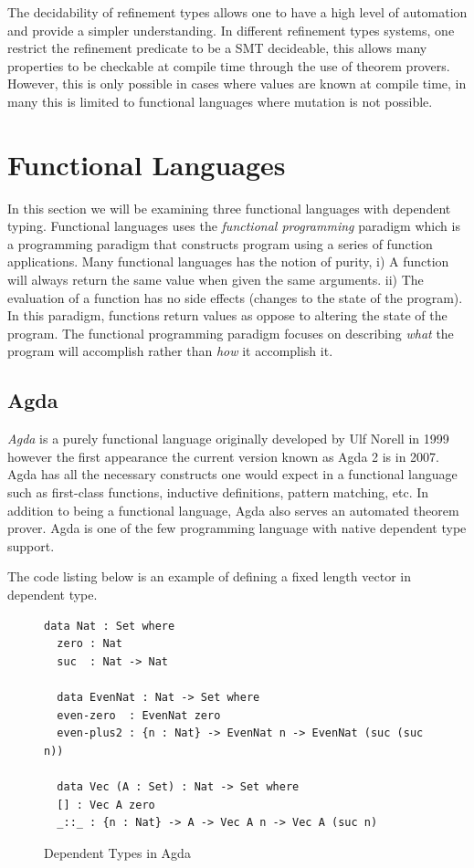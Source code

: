 \documentclass[a4paper,12pt]{report}
\begin{document}
\par
The decidability of refinement types allows one to have a high level of automation and 
provide a simpler understanding. In different refinement types systems, one 
restrict the refinement predicate to be a SMT decideable, this allows many 
properties to be checkable at compile time through the use of theorem provers. 
However, this is only possible in cases where values are known at compile time, 
in many this is limited to functional languages where mutation is not possible. 

\section{Functional Languages}
In this section we will be examining three functional languages with 
dependent typing. Functional languages 
uses the \textit{functional programming} \cite{overviewFP} paradigm which 
is a programming paradigm that constructs program using a series of function 
applications. Many functional languages has the notion of purity, i) A function will always 
return the same value when given the same arguments. ii) The evaluation of a 
function has no side effects (changes to the state of the program).
 In this paradigm, functions return values as oppose to 
altering the state of the program. The functional programming paradigm 
focuses on describing \textit{what} the program will accomplish rather than 
\textit{how} it accomplish it. 

\subsection{Agda}

\textit{Agda} \cite{agda} is a purely functional language originally developed by Ulf Norell in 
1999 however the first appearance the current version known as Agda 2 is in 
2007. Agda has all the necessary constructs one would expect in a functional 
language such as first-class functions, inductive definitions, pattern matching, 
etc. In addition to being a functional language, Agda also serves an automated theorem prover. 
Agda is one of the few programming language with native dependent type support. 

\par
The code listing below is an example of defining a fixed length vector in 
dependent type. 

\begin{figure}[H]
  \begin{lstlisting}[mathescape=true] 
  data Nat : Set where 
  zero : Nat
  suc  : Nat -> Nat  
  
  data EvenNat : Nat -> Set where
  even-zero  : EvenNat zero
  even-plus2 : {n : Nat} -> EvenNat n -> EvenNat (suc (suc n))
  
  data Vec (A : Set) : Nat -> Set where
  [] : Vec A zero
  _::_ : {n : Nat} -> A -> Vec A n -> Vec A (suc n)
  \end{lstlisting}
  \caption{Dependent Types in Agda}
\end{figure}
\end{document}
